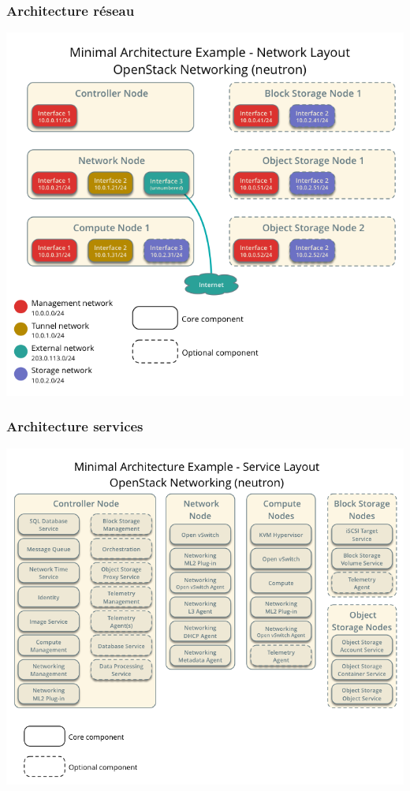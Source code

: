   \begin{frame}
    \frametitle{Architecture réseau}
    \begin{center}
      \includegraphics[width=\textwidth]{images/archi-network.png}
    \end{center}
  \end{frame}

  \begin{frame}
    \frametitle{Architecture services}
    \begin{center}
      \includegraphics[width=\textwidth]{images/archi-service.png}
    \end{center}
  \end{frame}

